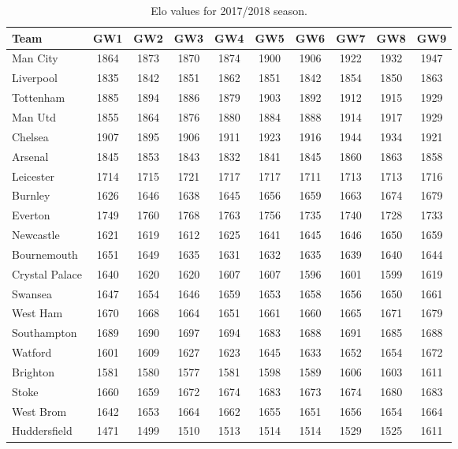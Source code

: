 \begin{table}[H]
\centering
\smaller
\begin{tabular}{|l|c|c|c|c|c|c|c|c|c|}
\hline
Team           & GW1  & GW2  & GW3  & GW4  & GW5  & GW6  & GW7  & GW8  & GW9   \\
\hline
Man City       & 1864 & 1873 & 1870 & 1874 & 1900 & 1906 & 1922 & 1932 & 1947  \\
Liverpool      & 1835 & 1842 & 1851 & 1862 & 1851 & 1842 & 1854 & 1850 & 1863  \\
Tottenham      & 1885 & 1894 & 1886 & 1879 & 1903 & 1892 & 1912 & 1915 & 1929  \\
Man Utd        & 1855 & 1864 & 1876 & 1880 & 1884 & 1888 & 1914 & 1917 & 1929  \\
Chelsea        & 1907 & 1895 & 1906 & 1911 & 1923 & 1916 & 1944 & 1934 & 1921  \\
Arsenal        & 1845 & 1853 & 1843 & 1832 & 1841 & 1845 & 1860 & 1863 & 1858  \\
Leicester      & 1714 & 1715 & 1721 & 1717 & 1717 & 1711 & 1713 & 1713 & 1716  \\
Burnley        & 1626 & 1646 & 1638 & 1645 & 1656 & 1659 & 1663 & 1674 & 1679  \\
Everton        & 1749 & 1760 & 1768 & 1763 & 1756 & 1735 & 1740 & 1728 & 1733  \\
Newcastle      & 1621 & 1619 & 1612 & 1625 & 1641 & 1645 & 1646 & 1650 & 1659  \\
Bournemouth    & 1651 & 1649 & 1635 & 1631 & 1632 & 1635 & 1639 & 1640 & 1644  \\
Crystal Palace & 1640 & 1620 & 1620 & 1607 & 1607 & 1596 & 1601 & 1599 & 1619  \\
Swansea        & 1647 & 1654 & 1646 & 1659 & 1653 & 1658 & 1656 & 1650 & 1661  \\
West Ham       & 1670 & 1668 & 1664 & 1651 & 1661 & 1660 & 1665 & 1671 & 1679  \\
Southampton    & 1689 & 1690 & 1697 & 1694 & 1683 & 1688 & 1691 & 1685 & 1688  \\
Watford        & 1601 & 1609 & 1627 & 1623 & 1645 & 1633 & 1652 & 1654 & 1672  \\
Brighton       & 1581 & 1580 & 1577 & 1581 & 1598 & 1589 & 1606 & 1603 & 1611  \\
Stoke          & 1660 & 1659 & 1672 & 1674 & 1683 & 1673 & 1674 & 1680 & 1683  \\
West Brom      & 1642 & 1653 & 1664 & 1662 & 1655 & 1651 & 1656 & 1654 & 1664  \\
Huddersfield   & 1471 & 1499 & 1510 & 1513 & 1514 & 1514 & 1529 & 1525 & 1611  \\
\hline
\end{tabular}
\caption{Elo values for 2017/2018 season.}
\label{tab:elo_values_gameweeks_1}
\end{table}


